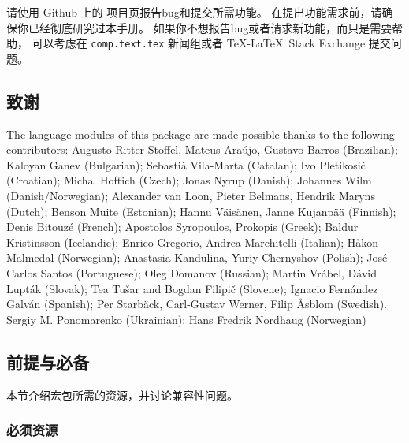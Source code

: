 请使用 Github 上的 \biblatex 项目页报告bug和提交所需功能。
在提出功能需求前，请确保你已经彻底研究过本手册。
如果你不想报告bug或者请求新功能，而只是需要帮助，
可以考虑在 \texttt{comp.text.tex} 新闻组或者 \TeX-\LaTeX\ Stack Exchange 提交问题。

\subsection{致谢}

The language modules of this package are made possible thanks to the following contributors:
Augusto Ritter Stoffel, Mateus Araújo, Gustavo Barros (Brazilian);
Kaloyan Ganev (Bulgarian);
Sebastià Vila-Marta (Catalan);
Ivo Pletikosić (Croatian);
Michal Hoftich (Czech);
Jonas Nyrup (Danish);
Johannes Wilm (Danish\slash Norwegian);
Alexander van Loon, Pieter Belmans, Hendrik Maryns (Dutch);
Benson Muite (Estonian);
Hannu Väisänen, Janne Kujanpää (Finnish);
Denis Bitouzé (French);
Apostolos Syropoulos, Prokopis (Greek);
Baldur Kristinsson (Icelandic);
Enrico Gregorio, Andrea Marchitelli (Italian);
Håkon Malmedal (Norwegian);
Anastasia Kandulina, Yuriy Chernyshov (Polish);
José Carlos Santos (Portuguese);
Oleg Domanov (Russian);
Martin Vrábel, Dávid Lupták (Slovak);
Tea Tušar and Bogdan Filipič (Slovene);
Ignacio Fernández Galván (Spanish);
Per Starbäck, Carl-Gustav Werner, Filip Åsblom (Swedish).
Sergiy M. Ponomarenko (Ukrainian);
Hans Fredrik Nordhaug (Norwegian)

\subsection{前提与必备}
\label{int:pre}

本节介绍宏包所需的资源，并讨论兼容性问题。

\subsubsection{必须资源}
\label{int:pre:req}

